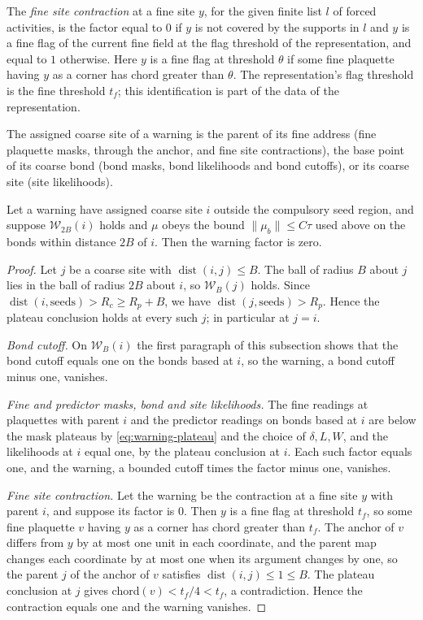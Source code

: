 The \emph{fine site contraction} at a fine site $y$, for the given finite
list $l$ of forced activities, is the factor equal to $0$ if $y$ is not
covered by the supports in $l$ and $y$ is a fine flag of the current
fine field at the flag threshold of the representation, and equal to $1$
otherwise. Here $y$ is a fine flag at threshold $\theta$ if some fine
plaquette having $y$ as a corner has chord greater than $\theta$. The
representation's flag threshold is the fine threshold $t_f$; this
identification is part of the data of the representation.

The assigned coarse site of a warning is the parent of its fine
address (fine plaquette masks, through the anchor, and fine site
contractions), the base point of its coarse bond (bond masks, bond
likelihoods and bond cutoffs), or its coarse site (site likelihoods).

\begin{lemma}\label{lem:warning-vanishes}
Let a warning have assigned coarse site $i$ outside the compulsory
seed region, and suppose $\mathcal W_{2B}(i)$ holds and $\mu$ obeys
the bound $\|\mu_b\|\le C\tau$ used above on the bonds within distance
$2B$ of $i$. Then the warning factor is zero.
\end{lemma}

\begin{proof}
Let $j$ be a coarse site with $\operatorname{dist}(i,j)\le B$. The
ball of radius $B$ about $j$ lies in the ball of radius $2B$ about $i$,
so $\mathcal W_B(j)$ holds. Since $\operatorname{dist}(i,\text{seeds})>R_c\ge R_p+B$,
we have $\operatorname{dist}(j,\text{seeds})>R_p$. Hence the plateau
conclusion holds at every such $j$; in particular at $j=i$.

\emph{Bond cutoff.} On $\mathcal W_B(i)$ the first paragraph of this
subsection shows that the bond cutoff equals one on the bonds based at
$i$, so the warning, a bond cutoff minus one, vanishes.

\emph{Fine and predictor masks, bond and site likelihoods.} The fine
readings at plaquettes with parent $i$ and the predictor readings on
bonds based at $i$ are below the mask plateaus by
\eqref{eq:warning-plateau} and the choice of $\delta,L,W$, and the
likelihoods at $i$ equal one, by the plateau conclusion at $i$. Each
such factor equals one, and the warning, a bounded cutoff times the
factor minus one, vanishes.

\emph{Fine site contraction.} Let the warning be the contraction at a
fine site $y$ with parent $i$, and suppose its factor is $0$. Then $y$
is a fine flag at threshold $t_f$, so some fine plaquette $v$ having $y$
as a corner has chord greater than $t_f$. The anchor of $v$ differs
from $y$ by at most one unit in each coordinate, and the parent map
changes each coordinate by at most one when its argument changes by
one, so the parent $j$ of the anchor of $v$ satisfies
$\operatorname{dist}(i,j)\le1\le B$. The plateau conclusion at $j$ gives
chord$(v)<t_f/4<t_f$, a contradiction. Hence the contraction equals one
and the warning vanishes.
\end{proof}

